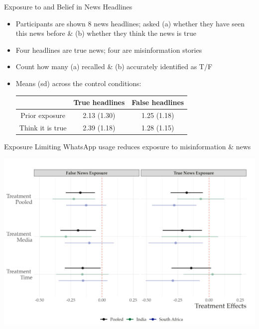 \documentclass[usenames,dvipsnames,t]{beamer}
\begin{document}
\begin{frame}{Exposure to and Belief in News Headlines} \small  

\vspace*{\fill}

\begin{itemize}
\item 	Participants are shown 8 news headlines; asked (a) whether they have seen this news before \& (b) whether they think the news is true \pause
\item 	Four headlines are true news; four are misinformation stories \pause
\item		Count how many (a) recalled \& (b) accurately identified as T/F  \pause
\item		Means (sd) across the control conditions:  
\begin{table}\centering
\begin{tabular}{ccc}
\hline  
& True headlines & False headlines  \\  \hline
Prior exposure & 2.13 (1.30)  & 1.25 (1.18) \\
Think it is true &  2.39  (1.18) &  1.28  (1.15) \\
\hline
\end{tabular}
\end{table} 
\end{itemize} 

\vspace*{\fill}

\end{frame}



\begin{frame}{Exposure} \small  
Limiting WhatsApp usage reduces exposure to misinformation \& news
\begin{center}
\includegraphics[scale=.37]{h1_itt}
\end{center}


\end{frame}
\end{document}
